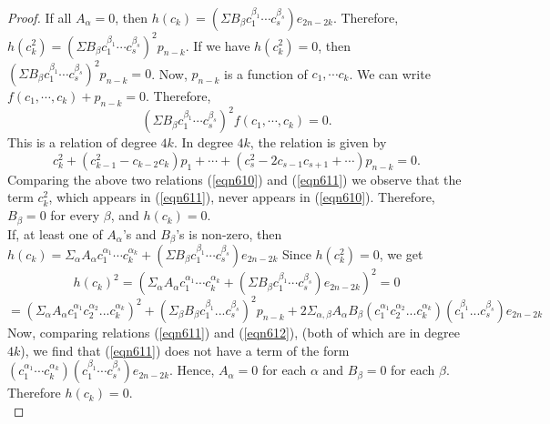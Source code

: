 \documentclass[a4paper,leqno,12pt]{amsart}
\theoremstyle{plain}
\theoremstyle{definition}
\theoremstyle{remark}
\begin{document}
{\begin{proof}
\noindent
If all $A_{\alpha} = 0$,  then  $h(c_{k}) =  (\Sigma B_{\beta} c_{1}^{\beta_{1}} \cdots c_{s}^{\beta_{s}})e_{2n-2k}$.
Therefore,  $h(c_{k}^{2}) = (\Sigma B_{\beta} c_{1}^{\beta_{1}} \cdots c_{s}^{\beta_{s}})^{2} p_{n-k}$.  If we have $h(c_{k}^{2}) =0$,  then $ (\Sigma B_{\beta} c_{1}^{\beta_{1}} \cdots c_{s}^{\beta_{s}})^{2} p_{n-k} = 0$. Now,  $p_{n-k}$ is a function of $c_{1} ,  \cdots c_{k}$.  We can write  $f(c_{1} ,  \cdots ,  c_{k}) + p_{n-k} =0$.  
Therefore,  
\begin{equation}
 (\Sigma B_{\beta} c_{1}^{\beta_{1}} \cdots c_{s}^{\beta_{s}})^{2} f(c_{1} ,  \cdots ,  c_{k}) = 0.   
 \label{eqn610}
 \end{equation}
 This is a relation of degree $4k$.  In degree $4k$,  the relation is given by 
\begin{equation}
c_{k}^{2} + (c_{k-1}^{2} -c_{k-2}c_{k})p_{1} + \cdots + (c_{s}^{2} - 2c_{s-1}c_{s+1} + \cdots ) p_{n-k} = 0.  
 \label{eqn611}
\end{equation}
Comparing the above two relations (\ref{eqn610}) and (\ref{eqn611}) we observe that the term $c_{k}^{2}$,  which appears in (\ref{eqn611}),  never appears in (\ref{eqn610}).  Therefore,  $B_{\beta} = 0$ for every $\beta$,  and $h(c_{k}) =0$. \\
\noindent
If, at least one of $A_{\alpha}$'s and $B_{\beta}$'s is non-zero,  then 
$h(c_{k}) = \Sigma_{\alpha} A_{\alpha} c_{1}^{\alpha_{1}} \cdots c_{k}^{\alpha_{k}} + (\Sigma B_{\beta} c_{1}^{\beta_{1}} \cdots c_{s}^{\beta_{s}})e_{2n-2k}$
\noindent
Since $h(c_{k}^{2}) = 0$,  we get 
\begin{equation}
 h(c_{k})^{2}= ( \Sigma_{\alpha} A_{\alpha} c_{1}^{\alpha_{1}} \cdots c_{k}^{\alpha_{k}} + (\Sigma B_{\beta} c_{1}^{\beta_{1}} \cdots c_{s}^{\beta_{s}})e_{2n-2k})^{2} = 0  
\label{eqn612}
\end{equation}
\begin{equation}
=  (\Sigma_{\alpha} A_{\alpha} c_{1}^{\alpha_{1}}c_{2}^{\alpha_{2}}...c_{k}^{\alpha_{k}})^{2}+ (\Sigma_{\beta} B_{\beta} c_{1}^{\beta_{1}}...c_{s}^{\beta_{s}})^{2}p_{n-k} + 2\Sigma_{\alpha, \beta}A_{\alpha}B_{\beta}(c_{1}^{\alpha_{1}}c_{2}^{\alpha_{2}}...c_{k}^{\alpha_{k}})(c_{1}^{\beta_{1}}...c_{s}^{\beta_{s}})e_{2n-2k}
\nonumber
\end{equation}
\noindent
Now,  comparing relations (\ref{eqn611}) and (\ref{eqn612}),  (both of which are in degree $4k$),  we find that (\ref{eqn611}) does not have a term of the form $(c_{1}^{\alpha_{1}} \cdots c_{k}^{\alpha_{k}}) (c_{1}^{\beta_{1}} \cdots c_{s}^{\beta_{s}})e_{2n-2k}$.  Hence,  $A_{\alpha} =0$ for each $\alpha$ and $B_{\beta}=0$ for each $\beta$.  Therefore $h(c_{k}) =0$.  \\

\end{proof}}
\end{document}

